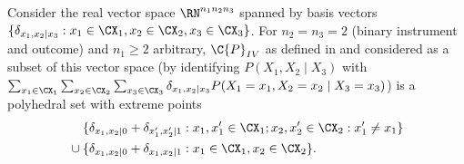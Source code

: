   \begin{Lem}\label{lem:extreme_points_IV_kernel}
  Consider the real vector space $\RN^{n_1 n_2 n_3}$ spanned by basis vectors 
  $\{\delta_{x_1,x_2|x_3} : x_1 \in \CX_1, x_2 \in \CX_2, x_3 \in \CX_3\}$.
  For $n_2 = n_3 = 2$ (binary instrument and outcome) and $n_1 \ge 2$ arbitrary, $\C{P}_{IV}$ as defined in 
  and considered as a subset of this vector space (by identifying $P(X_1,X_2 \mid X_3)$ with $\sum_{x_1\in\CX_1}\sum_{x_2\in\CX_2}\sum_{x_3\in\CX_3} \delta_{x_1,x_2|x_3} P(X_1=x_1,X_2=x_2 \mid X_3=x_3)$)
  is a polyhedral set with extreme points
  \begin{equation*}\begin{split}
    & \phantom{{} \cup {}}\{\delta_{x_1,x_2|0} + \delta_{x_1',x_2'|1} : x_1,x_1' \in \CX_1; x_2,x_2' \in \CX_2 : x_1' \ne x_1\} \\
    & {} \cup \{\delta_{x_1,x_2|0} + \delta_{x_1,x_2|1} : x_1 \in \CX_1, x_2 \in \CX_2\}.
  \end{split}\end{equation*}
\end{Lem}
